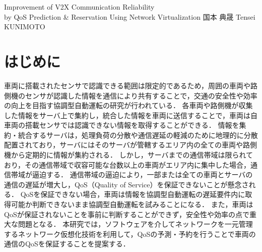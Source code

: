 \documentclass[a4paper,10pt,twocolumn,uplatex]{jsarticle}
\date{30}
\begin{document}
{Improvement of V2X Communication Reliability\\by QoS Prediction \& Reservation Using Network Virtualization}
{国本 典晟}
{Tensei KUNIMOTO}

\section{はじめに}
車両に搭載されたセンサで認識できる範囲は限定的であるため，周囲の車両や路側機のセンサが認識した情報を通信により共有することで，交通の安全性や効率の向上を目指す協調型自動運転の研究が行われている\cite{Cooperative}．
各車両や路側機が収集した情報をサーバ上で集約し，統合した情報を車両に送信することで，車両は自車両の搭載センサでは認識できない情報を取得することができる．
情報を集約・統合するサーバは，処理負荷の分散や通信遅延の軽減のために地理的に分散配置されており\cite{MEC}，サーバにはそのサーバが管轄するエリア内の全ての車両や路側機から定期的に情報が集約される．
しかし，サーバまでの通信帯域は限られており，その通信帯域で収容可能な台数以上の車両がエリア内に集中した場合，通信帯域が逼迫する．
通信帯域の逼迫により，一部または全ての車両とサーバの通信の遅延が増大し，QoS（Quality of Service）を保証できないことが懸念される\cite{QoS}．
QoSを保証できない場合，車両は情報を協調型自動運転の遅延要件内に取得可能か判断できないまま協調型自動運転を試みることになる．
また，車両はQoSが保証されないことを事前に判断することができず，安全性や効率の点で重大な問題となる．
本研究では，ソフトウェアを介してネットワークを一元管理するネットワーク仮想化技術を利用して，QoSの予測・予約を行うことで車両の通信のQoSを保証することを提案する．
\end{document}
